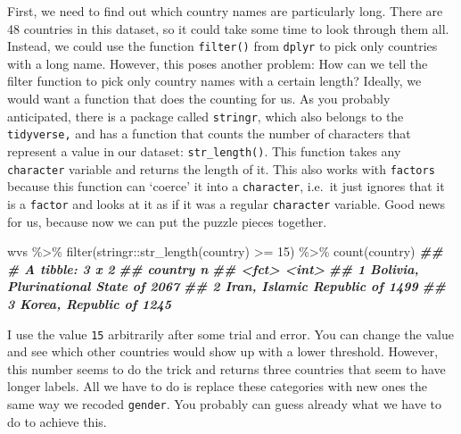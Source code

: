 \documentclass[
]{book}
\newenvironment{Shaded}{\begin{snugshade}}{\end{snugshade}}
\newcommand{\DecValTok}[1]{\textcolor[rgb]{0.00,0.00,0.81}{#1}}
\newcommand{\DocumentationTok}[1]{\textcolor[rgb]{0.56,0.35,0.01}{\textbf{\textit{#1}}}}
\newcommand{\FunctionTok}[1]{\textcolor[rgb]{0.00,0.00,0.00}{#1}}
\newcommand{\NormalTok}[1]{#1}
\newcommand{\SpecialCharTok}[1]{\textcolor[rgb]{0.00,0.00,0.00}{#1}}
\begin{document}
First, we need to find out which country names are particularly long. There are 48 countries in this dataset, so it could take some time to look through them all. Instead, we could use the function \texttt{filter()} from \texttt{dplyr} to pick only countries with a long name. However, this poses another problem: How can we tell the filter function to pick only country names with a certain length? Ideally, we would want a function that does the counting for us. As you probably anticipated, there is a package called \texttt{stringr}, which also belongs to the \texttt{tidyverse,} and has a function that counts the number of characters that represent a value in our dataset: \texttt{str\_length()}. This function takes any \texttt{character} variable and returns the length of it. This also works with \texttt{factors} because this function can `coerce' it into a \texttt{character}, i.e.~it just ignores that it is a \texttt{factor} and looks at it as if it was a regular \texttt{character} variable. Good news for us, because now we can put the puzzle pieces together.

\begin{Shaded}
\begin{Highlighting}[]
\NormalTok{wvs }\SpecialCharTok{\%\textgreater{}\%}
  \FunctionTok{filter}\NormalTok{(stringr}\SpecialCharTok{::}\FunctionTok{str\_length}\NormalTok{(country) }\SpecialCharTok{\textgreater{}=} \DecValTok{15}\NormalTok{) }\SpecialCharTok{\%\textgreater{}\%} 
  \FunctionTok{count}\NormalTok{(country)}
\DocumentationTok{\#\# \# A tibble: 3 x 2}
\DocumentationTok{\#\#   country                             n}
\DocumentationTok{\#\#   \textless{}fct\textgreater{}                           \textless{}int\textgreater{}}
\DocumentationTok{\#\# 1 Bolivia, Plurinational State of  2067}
\DocumentationTok{\#\# 2 Iran, Islamic Republic of        1499}
\DocumentationTok{\#\# 3 Korea, Republic of               1245}
\end{Highlighting}
\end{Shaded}

I use the value \texttt{15} arbitrarily after some trial and error. You can change the value and see which other countries would show up with a lower threshold. However, this number seems to do the trick and returns three countries that seem to have longer labels. All we have to do is replace these categories with new ones the same way we recoded \texttt{gender}. You probably can guess already what we have to do to achieve this.
\end{document}
